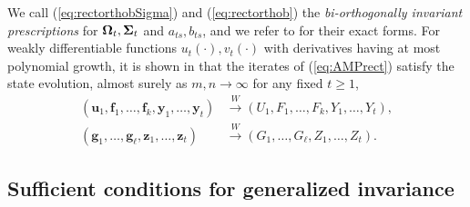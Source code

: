 \documentclass[10pt,reqno]{amsart}
\def\u{\mathbf{u}}
\def\y{\mathbf{y}}
\def\z{\mathbf{z}}
\def\f{\mathbf{f}}
\def\g{\mathbf{g}}
\def\toW{\overset{W}{\to}}
\begin{document}
We call (\ref{eq:rectorthobSigma}) and (\ref{eq:rectorthob}) the
\emph{bi-orthogonally invariant prescriptions} for $\bm{\Omega}_t,\bm{\Sigma}_t$ and
$a_{ts},b_{ts}$, and we refer to \cite[Section 5]{fan2022approximate} for their
exact forms. For weakly differentiable functions
$u_t(\cdot),v_t(\cdot)$ with derivatives having at most polynomial growth,
it is shown in \cite{fan2022approximate}
that the iterates of (\ref{eq:AMPrect}) satisfy the state evolution,
almost surely as $m,n \to \infty$ for any fixed $t \geq 1$,
\begin{align*}
(\u_1,\f_1,\ldots,\f_k,\y_1,\ldots,\y_t) &\toW
(U_1,F_1,\ldots,F_k,Y_1,\ldots,Y_t),\\
(\g_1,\ldots,\g_\ell,\z_1,\ldots,\z_t) &\toW
(G_1,\ldots,G_\ell,Z_1,\ldots,Z_t).
\end{align*}

\subsection{Sufficient conditions for generalized
invariance}\label{subsec:rectinvariant}
\end{document}
